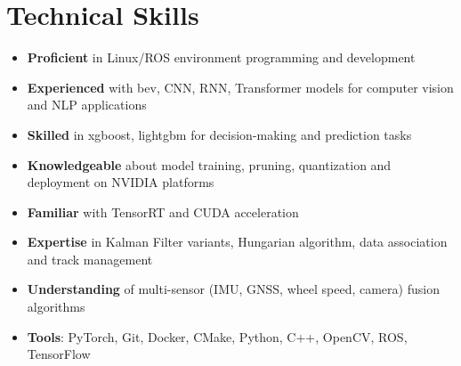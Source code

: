 \documentclass[11pt,a4paper]{article}
\begin{document}
\section*{Technical Skills}
\begin{itemize}[leftmargin=*]
    \item \textbf{Proficient} in Linux/ROS environment programming and development
    \item \textbf{Experienced} with bev, CNN, RNN, Transformer models for computer vision and NLP applications
    \item \textbf{Skilled} in xgboost, lightgbm for decision-making and prediction tasks
    \item \textbf{Knowledgeable} about model training, pruning, quantization and deployment on NVIDIA platforms
    \item \textbf{Familiar} with TensorRT and CUDA acceleration
    \item \textbf{Expertise} in Kalman Filter variants, Hungarian algorithm, data association and track management
    \item \textbf{Understanding} of multi-sensor (IMU, GNSS, wheel speed, camera) fusion algorithms
    \item \textbf{Tools}: PyTorch, Git, Docker, CMake, Python, C++, OpenCV, ROS, TensorFlow
\end{itemize}
\end{document}
